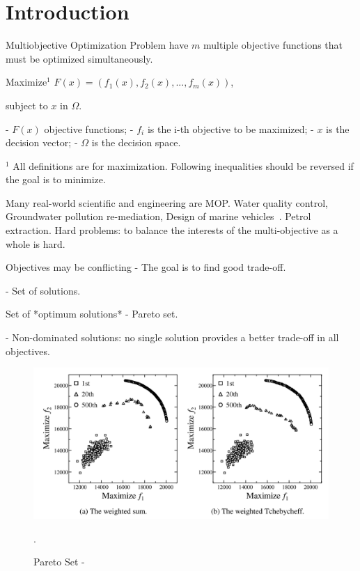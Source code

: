 \section{Introduction}\label{intro}

Multiobjective Optimization Problem have $m$ multiple objective functions that must be optimized simultaneously.

Maximize$^1$ $F(x) = (f_1(x), f_2(x), ..., f_m(x))$,

subject to $x$ in $\Omega$.

- $F(x)$ objective functions;
- $f_i$ is the i-th objective to be maximized;
- $x$ is the decision vector;
- $\Omega$ is the decision space.

\footnotesize $^1$ All definitions are for maximization. Following inequalities should be reversed if the goal is to minimize.

 Many real-world scientific and engineering are MOP.
 Water quality control, Groundwater pollution re-mediation, Design of marine vehicles~\cite{coello2007evolutionary}.
 Petrol extraction.
 Hard problems: to balance the interests of the multi-objective as a whole is hard. 



Objectives may be conflicting
- The goal is to find good trade-off.

- Set of solutions.

Set of *optimum solutions* - Pareto set.

- Non-dominated solutions: no single solution provides a better trade-off in all objectives.

\begin{figure}[!t]
\centering
\includegraphics[width=\textwidth]{images/pareto_front_diff_scalarizins_f.png}
\caption{Pareto Set - \cite{ishibuchi2009adaptation} }.
\end{figure}


